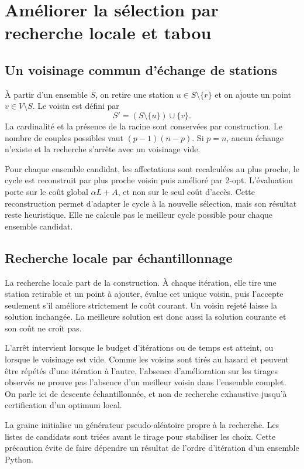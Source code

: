 \chapter{Améliorer la sélection par recherche locale et tabou}
\section{Un voisinage commun d'échange de stations}
À partir d'un ensemble $S$, on retire une station $u\in S\setminus\{r\}$ et
on ajoute un point $v\in V\setminus S$. Le voisin est défini par
\begin{equation}
S'=(S\setminus\{u\})\cup\{v\}.
\end{equation}
La cardinalité et la présence de la racine sont conservées par construction.
Le nombre de couples possibles vaut $(p-1)(n-p)$. Si $p=n$, aucun échange
n'existe et la recherche s'arrête avec un voisinage vide.

Pour chaque ensemble candidat, les affectations sont recalculées au plus proche,
le cycle est reconstruit par plus proche voisin puis amélioré par 2-opt.
L'évaluation porte sur le coût global $\alpha L+A$, et non sur le seul coût
d'accès. Cette reconstruction permet d'adapter le cycle à la nouvelle sélection,
mais son résultat reste heuristique. Elle ne calcule pas le meilleur cycle
possible pour chaque ensemble candidat.

\section{Recherche locale par échantillonnage}
La recherche locale part de la construction. À chaque itération, elle tire une
station retirable et un point à ajouter, évalue cet unique voisin, puis
l'accepte seulement s'il améliore strictement le coût courant. Un voisin rejeté
laisse la solution inchangée. La meilleure solution est donc aussi la solution
courante et son coût ne croît pas.

L'arrêt intervient lorsque le budget d'itérations ou de temps est atteint,
ou lorsque le voisinage est vide. Comme les voisins sont tirés au hasard et
peuvent être répétés d'une itération à l'autre, l'absence d'amélioration sur
les tirages observés ne prouve pas l'absence d'un meilleur voisin dans
l'ensemble complet. On parle ici de descente échantillonnée, et non de
recherche exhaustive jusqu'à certification d'un optimum local.

La graine initialise un générateur pseudo-aléatoire propre à la recherche.
Les listes de candidats sont triées avant le tirage pour stabiliser les choix.
Cette précaution évite de faire dépendre un résultat de l'ordre d'itération
d'un ensemble Python.

